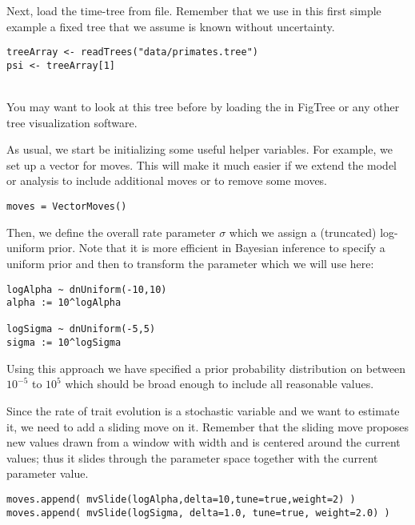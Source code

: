 Next, load the time-tree from file. Remember that we use in this first simple example a fixed tree that we assume is known without uncertainty.
{\tt \small \begin{snugshade*}
\begin{lstlisting}
treeArray <- readTrees("data/primates.tree")
psi <- treeArray[1]
\end{lstlisting}
\end{snugshade*}}
\noindent \\ \impmark You may want to look at this tree before by loading the  in FigTree or any other tree visualization software.

As usual, we start be initializing some useful helper variables.
For example, we set up a vector for moves.
This will make it much easier if we extend the model or analysis to include additional moves or to remove some moves.
{\tt \begin{snugshade*}
\begin{lstlisting}
moves = VectorMoves() 
\end{lstlisting}
\end{snugshade*}}

Then, we define the overall rate parameter $\sigma$ which we assign a (truncated) log-uniform prior. Note that it is more efficient in Bayesian inference to specify a uniform prior and then to transform the parameter which we will use here:
{\tt \small \begin{snugshade*}
\begin{lstlisting}
logAlpha ~ dnUniform(-10,10)
alpha := 10^logAlpha

logSigma ~ dnUniform(-5,5)
sigma := 10^logSigma
\end{lstlisting}
\end{snugshade*}}
Using this approach we have specified a prior probability distribution on  between $10^{-5}$ to $10^5$ which should be broad enough to include all reasonable values.

Since the rate of trait evolution  is a stochastic variable and we want to estimate it, we need to add a sliding move on it. Remember that the sliding move proposes new values drawn from a window with width  and is centered around the current values; thus it slides through the parameter space together with the current parameter value.
{\tt \small \begin{snugshade*}
\begin{lstlisting}
moves.append( mvSlide(logAlpha,delta=10,tune=true,weight=2) )
moves.append( mvSlide(logSigma, delta=1.0, tune=true, weight=2.0) )
\end{lstlisting}
\end{snugshade*}}

